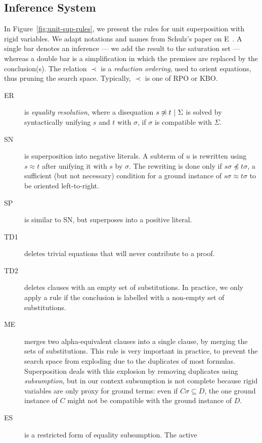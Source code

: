 \subsection{Inference System}

In Figure~\ref{fig:unit-sup-rules}, we present the  rules for unit superposition
with rigid variables.
We adapt notations and names from Schulz's paper on E~\cite{SS02}.
A single bar denotes an inference --- we add the result to the saturation set ---
whereas a double bar is a simplification in which the premises are
replaced by the conclusion(s).
The relation $\prec$ is a {\em reduction ordering}, used to orient equations,
thus pruning the search space.
Typically, $\prec$ is one of RPO or KBO.

\begin{description}
  \item[ER] is {\em equality resolution},
    where a disequation $s \not\approx t ~|~ \Sigma$
    is solved by syntactically unifying $s$ and $t$ with $\sigma$,
    if $\sigma$ is compatible with $\Sigma$.
  \item[SN] is superposition into negative literals. A subterm of $u$
    is rewritten using $s \approx t$ after unifying it with $s$
    by $\sigma$.
    The rewriting is done only if $s\sigma \not\preceq t\sigma$,
    a sufficient (but not necessary) condition for a
    ground instance of $s\sigma \approx t\sigma$
    to be oriented left-to-right.
  \item[SP] is similar to SN, but superposes into a positive literal.
  \item[TD1] deletes trivial equations that will never contribute to a proof.
  \item[TD2] deletes clauses with an empty set of substitutions.
    In practice, we only apply a rule if the conclusion is labelled with a
    non-empty set of substitutions.
  \item[ME] merges two alpha-equivalent clauses into a single clause,
    by merging the sets of substitutions.
    This rule is very important in practice, to prevent the search space
    from exploding due to the duplicates of most formulas.
    Superposition deals with this explosion by removing duplicates using
    {\em subsumption}, but in our context subsumption is not complete
    because rigid variables are only proxy for ground terms:
    even if $C\sigma \subseteq D$, the one ground instance of $C$ might not
    be compatible with the ground instance of $D$.
  \item[ES] is a restricted form of equality subsumption. The active

\end{description}

